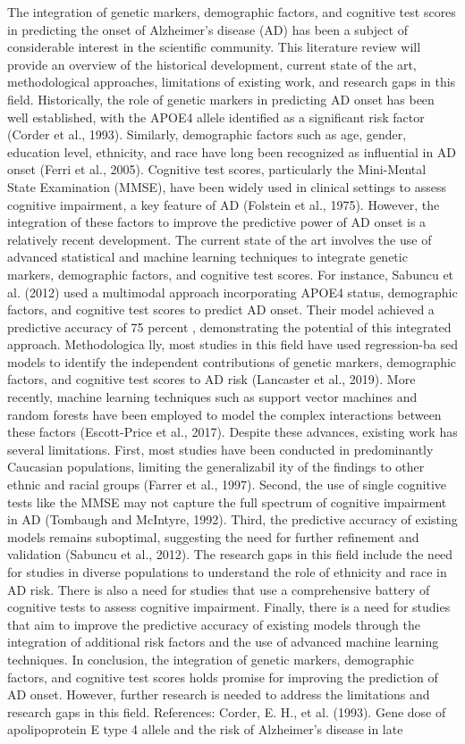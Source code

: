 \documentclass[conference]{IEEEtran}
\begin{document}
The integration of genetic markers, demographic factors, and cognitive test scores in predicting the onset of Alzheimer's disease (AD) has been a subject of considerable interest in the scientific community. This literature review will provide an overview of the historical development, current state of the art, methodological approaches, limitations of existing work, and research gaps in this field. Historically, the role of genetic markers in predicting AD onset has been well established, with the APOE4 allele identified as a significant risk factor (Corder et al., 1993). Similarly, demographic factors such as age, gender, education level, ethnicity, and race have long been recognized as influential in AD onset (Ferri et al., 2005). Cognitive test scores, particularly the Mini-Mental State Examination (MMSE), have been widely used in clinical settings to assess cognitive impairment, a key feature of AD (Folstein et al., 1975). However, the integration of these factors to improve the predictive power of AD onset is a relatively recent development. The current state of the art involves the use of advanced statistical and machine learning techniques to integrate genetic markers, demographic factors, and cognitive test scores. For instance, Sabuncu et al. (2012) used a multimodal approach incorporating APOE4 status, demographic factors, and cognitive test scores to predict AD onset. Their model achieved a predictive accuracy of 75 percent , demonstrating the potential of this integrated approach. Methodologica lly, most studies in this field have used regression-ba sed models to identify the independent contributions of genetic markers, demographic factors, and cognitive test scores to AD risk (Lancaster et al., 2019). More recently, machine learning techniques such as support vector machines and random forests have been employed to model the complex interactions between these factors (Escott-Price et al., 2017). Despite these advances, existing work has several limitations. First, most studies have been conducted in predominantly Caucasian populations, limiting the generalizabil ity of the findings to other ethnic and racial groups (Farrer et al., 1997). Second, the use of single cognitive tests like the MMSE may not capture the full spectrum of cognitive impairment in AD (Tombaugh and McIntyre, 1992). Third, the predictive accuracy of existing models remains suboptimal, suggesting the need for further refinement and validation (Sabuncu et al., 2012). The research gaps in this field include the need for studies in diverse populations to understand the role of ethnicity and race in AD risk. There is also a need for studies that use a comprehensive battery of cognitive tests to assess cognitive impairment. Finally, there is a need for studies that aim to improve the predictive accuracy of existing models through the integration of additional risk factors and the use of advanced machine learning techniques. In conclusion, the integration of genetic markers, demographic factors, and cognitive test scores holds promise for improving the prediction of AD onset. However, further research is needed to address the limitations and research gaps in this field. References: Corder, E. H., et al. (1993). Gene dose of apolipoprotein E type 4 allele and the risk of Alzheimer's disease in late 
\end{document}
